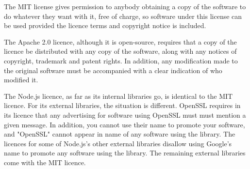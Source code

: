 \documentclass[a4wide, 11pt]{article}
\begin{document}
The MIT license gives permission to anybody obtaining a copy of the software to do whatever they want with it, free of charge, so software under this license can be used provided the licence terms and copyright notice is included.

The Apache 2.0 licence, although it is open-source, requires that a copy of the licence be distributed with any copy of the software, along with any notices of copyright, trademark and patent rights. In addition, any modification made to the original software must be accompanied with a clear indication of who modified it.

The Node.js licence, as far as its internal libraries go, is identical to the MIT licence. For its external libraries, the situation is different. OpenSSL requires in its licence that any advertising for software using OpenSSL must must mention a given message. In addition, you cannot use their name to promote your software, and "OpenSSL" cannot appear in name of any software using the library. The licences for some of Node.js's other external libraries disallow using Google's name to promote any software using the library. The remaining external libraries come with the MIT licence.
\end{document}
